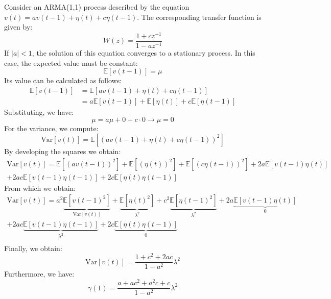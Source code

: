 \begin{example}
    Consider an ARMA(1,1) process described by the equation $v(t) = av(t-1) + \eta(t) + c\eta(t-1)$. 
    The corresponding transfer function is given by:
    \[W(z)=\dfrac{1+cz^{-1}}{1-az^{-1}}\]
    If $\left\lvert a\right\rvert  < 1$, the solution of this equation converges to a stationary process. 
    In this case, the expected value must be constant:
    \[\mathbb{E}\left[v(t-1)\right]=\mu\]
    Its value can be calculated as follows:
    \begin{align*}
        \mathbb{E}\left[v(t-1)\right] &= \mathbb{E}\left[av(t-1)+\eta(t)+c\eta(t-1)\right] \\
                                      &= a\mathbb{E}\left[v(t-1)\right]+\mathbb{E}\left[\eta(t)\right]+c\mathbb{E}\left[\eta(t-1)\right]
    \end{align*}
    Substituting, we have:
    \[\mu=a\mu+0+c\cdot 0 \rightarrow \mu=0\]
    For the variance, we compute:
    \[\text{Var}\left[v(t)\right] =\mathbb{E}\left[\left( av(t-1)+\eta(t)+c\eta(t-1) \right)^2\right]\] 
    By developing the squares we obtain:   
    \begin{multline*}
        \text{Var}\left[v(t)\right] =\mathbb{E}\left[(av(t-1))^2\right] +\mathbb{E}\left[(\eta(t))^2\right]+\mathbb{E}\left[(c\eta(t-1))^2\right] + 2a\mathbb{E}\left[ v(t-1)\eta(t) \right] \\+ 2ac \mathbb{E}\left[v(t-1)\eta(t-1)\right] + 2c\mathbb{E}\left[\eta(t)\eta(t-1)\right]
    \end{multline*}
    From which we obtain: 
    \begin{multline*}
        \text{Var}\left[v(t)\right] =a^2\underbrace{\mathbb{E}\left[v(t-1)^2\right]}_{\text{Var}\left[v(t)\right]} +\underbrace{\mathbb{E}\left[\eta(t)^2\right]}_{\lambda^2} +c^2\underbrace{\mathbb{E}\left[\eta(t-1)^2\right]}_{\lambda^2} +2a\underbrace{\mathbb{E}\left[ v(t-1)\eta(t) \right]}_{0} \\ + 2ac \underbrace{\mathbb{E}\left[v(t-1)\eta(t-1)\right]}_{\lambda^2} + 2c\underbrace{\mathbb{E}\left[\eta(t)\eta(t-1)\right]}_{0}  \\
    \end{multline*}
    Finally, we obtain: 
    \[\text{Var}\left[v(t)\right]=\dfrac{1+c^2+2ac}{1-a^2}\lambda^2\]
    Furthermore, we have:
    \[\gamma(1)=\dfrac{a + ac^2 + a^2c+c}{1-a^2}\lambda^2\]
\end{example}


